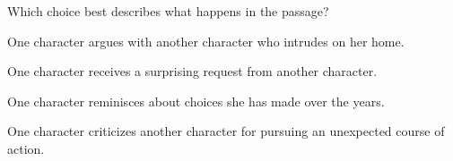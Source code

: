 \documentclass{article}
\begin{document}
\begin{enumext}[label=\arabic*,labelwidth=20pt,labelsep=0pt,columns=2,columns-sep=30pt,save-ans=stylesat, wrap-label={\stylesat{#1}}]
 \item Which choice best describes what happens in the passage?
 
   \begin{keyans}
    \item One character argues with another character who intrudes on her home.
    \item One character receives a surprising request from another character.
    \item One character reminisces about choices she has made over the years.
    \item* One character criticizes another character for pursuing an unexpected course of action.
   \end{keyans}
\end{enumext}

\end{document}

